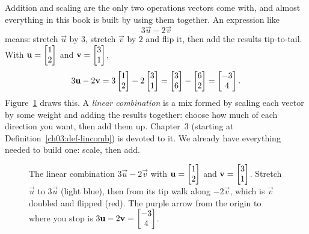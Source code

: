 Addition and scaling are the only two operations vectors come with, and almost everything
in this book is built by using them together. An expression like
\[
  3\vec{u} - 2\vec{v}
\]
means: stretch $\vec{u}$ by $3$, stretch $\vec{v}$ by $2$ and flip it, then add the
results tip-to-tail. With $\mathbf{u}=\begin{bmatrix}1\\2\end{bmatrix}$ and $\mathbf{v}=\begin{bmatrix}3\\1\end{bmatrix}$,
\[
  3\mathbf{u}-2\mathbf{v}
  = 3\begin{bmatrix}1\\2\end{bmatrix} - 2\begin{bmatrix}3\\1\end{bmatrix}
  = \begin{bmatrix}3\\6\end{bmatrix} - \begin{bmatrix}6\\2\end{bmatrix}
  = \begin{bmatrix}-3\\4\end{bmatrix}.
\]
Figure~\ref{ch02:fig-lincomb} draws this. A \emph{linear combination} is a mix formed by
scaling each vector by some weight and adding the results together: choose how much of
each direction you want, then add them up. Chapter~3 (starting at
Definition~\ref{ch03:def-lincomb}) is devoted to it. We already have everything needed
to build one: scale, then add.

\begin{figure}[htbp]
\centering
{}
\caption{The linear combination $3\vec{u}-2\vec{v}$ with $\mathbf{u}=\begin{bmatrix}1\\2\end{bmatrix}$ and
$\mathbf{v}=\begin{bmatrix}3\\1\end{bmatrix}$. Stretch $\vec{u}$ to $3\vec{u}$ (light blue), then from its tip
walk along $-2\vec{v}$, which is $\vec{v}$ doubled and flipped (red). The purple arrow
from the origin to where you stop is $3\mathbf{u}-2\mathbf{v}=\begin{bmatrix}-3\\4\end{bmatrix}$.}
\label{ch02:fig-lincomb}
\end{figure}

